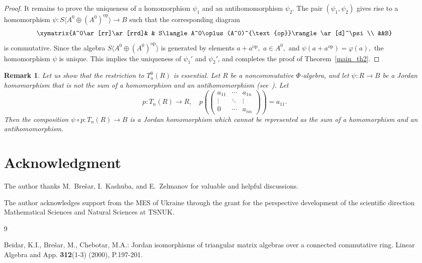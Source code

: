 \documentclass[12pt]{amsart}
\newtheorem{Rem}{Remark}
\begin{document}
{\begin{proof}
It remains to prove the uniqueness of  a homomorphism $\psi_1$ and  an antihomomorphism $\psi_2$. The pair $(\psi_1, \psi_2)$ gives rise to a homomorphism $\psi: S\langle   A^0\oplus (A^0)^{\text{op}}\rangle \to B$ such that the corresponding diagram
	$$
\xymatrix{A^0\ar[rr]\ar[rrd]& &
	S\langle   A^0\oplus (A^0)^{\text{op}}\rangle \ar[d]^\psi
	\\ &&B} $$
is   commutative. Since the algebra $S\langle   A^0\oplus (A^0)^{\text{op}}\rangle $ is generated by elements $a+a^{\text{op}},$ $a\in A^0,$ and $\psi(a+ a^{\text{op}})=\varphi(a),$ the homomorphism $\psi$ is unique. This implies the uniqueness of $\psi_1'$ and $\psi_2'$, and completes the proof of Theorem~\ref{main_th2}. \end{proof}

\begin{Rem} {\rm  Let us show that the restriction to $T_n^0(R)$ is essential.  
Let $R$ be a noncommutative $\Phi$-algebra, and let 
\(\psi : R \to B\) be a Jordan homomorphism that is not the sum of a homomorphism and an antihomomorphism 
(see~\cite{Bezushchak_Kashuba_Zelmanov,Bresar0,Jacobson2}).  Let $$p : T_n(R) \to R, \quad p\left(\begin{pmatrix}
	a_{11}  & \cdots & a_{1n} \\
	\vdots & \ddots & \vdots \\
	0           & \cdots & a_{nn}
\end{pmatrix}\right) = a_{11}.$$
Then the composition  $\psi \circ p : T_n(R) \to B$ is a Jordan homomorphism which cannot be represented as the sum of a homomorphism and an antihomomorphism. }\end{Rem}


\section*{Acknowledgment}

The author thanks  M.~Bre\v{s}ar, I.~Kashuba, and E.~Zelmanov for valuable and helpful discussions.

The author acknowledges support from the MES of Ukraine through the grant for the perspective development of the scientific direction Mathematical Sciences and Natural Sciences at TSNUK.

\begin{thebibliography}{9}
	

		 Beidar, K.I., Bre\v{s}ar, M., Chebotar, M.A.:  Jordan isomorphisms of triangular matrix algebras over 
	a connected commutative ring.	Linear Algebra and App. \textbf{312}(1-3) (2000), P.197-201.
	

\end{thebibliography}}
\end{document}
